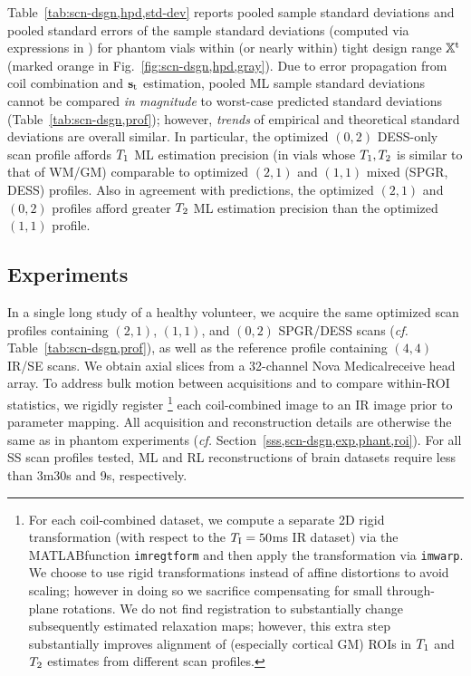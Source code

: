 Table~\ref{tab:scn-dsgn,hpd,std-dev} reports 
pooled sample standard deviations 
and pooled standard errors of the sample standard deviations 
(computed via expressions in \cite{ahn:03:seo}) 
for phantom vials within (or nearly within) 
tight design range $\mathbb{X}^\mathrm{t}$ 
(marked orange in Fig.~\ref{fig:scn-dsgn,hpd,gray}).
Due to error propagation from coil combination 
and $\mathbf{s}_\mathrm{t}$ estimation, 
pooled ML sample standard deviations 
cannot be compared \emph{in magnitude} 
to worst-case predicted standard deviations 
(Table~\ref{tab:scn-dsgn,prof}); 
however, \emph{trends} 
of empirical and theoretical standard deviations 
are overall similar.
In particular, 
the optimized $(0,2)$ DESS-only scan profile 
affords $T_1$ ML estimation precision 
(in vials whose $T_1,T_2$ is similar to that of WM/GM) 
comparable to optimized $(2,1)$ and $(1,1)$ 
mixed (SPGR, DESS) profiles. 
Also in agreement with predictions, 
the optimized $(2,1)$ and $(0,2)$ profiles 
afford greater $T_2$ ML estimation precision 
than the optimized $(1,1)$ profile.

\subsection{\Invivo Experiments}
\label{ss,scn-dsgn,exp,invivo}

In a single long study of a healthy volunteer, 
we acquire the same optimized scan profiles 
containing $(2,1)$, $(1,1)$, and $(0,2)$ SPGR/DESS scans 
(\emph{cf.} Table~\ref{tab:scn-dsgn,prof}), 
as well as the reference profile 
containing $(4,4)$ IR/SE scans.
We obtain axial slices 
from a 32-channel Nova Medical\regis receive head array.
To address bulk motion between acquisitions 
and to compare within-ROI statistics, 
we rigidly register
\footnote{For each coil-combined dataset, 
we compute a separate 2D rigid transformation 
(with respect to the $T_\mathrm{I} = 50$ms IR dataset) 
via the MATLAB\regis function \texttt{imregtform} 
and then apply the transformation via \texttt{imwarp}.
We choose to use rigid transformations 
instead of affine distortions to avoid scaling; 
however in doing so we sacrifice compensating 
for small through-plane rotations. 
We do not find registration 
to substantially change subsequently estimated relaxation maps; 
however, this extra step substantially improves alignment 
of (especially cortical GM) ROIs 
in $T_1$ and $T_2$ estimates from different scan profiles.
} 
each coil-combined image to an IR image
prior to parameter mapping.
All acquisition and reconstruction details 
are otherwise the same as in phantom experiments
(\emph{cf.} Section~\ref{sss,scn-dsgn,exp,phant,roi}). 
For all SS scan profiles tested, 
ML and RL reconstructions 
of brain datasets require less than 3m30s and 9s, respectively.


